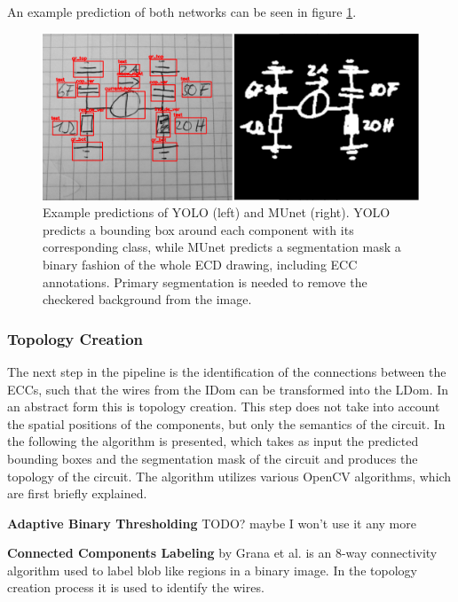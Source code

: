 An example prediction of both networks can be seen in figure \ref{fig:example_predictions}.

\begin{figure}
\begin{center}
    \includegraphics[width=16cm]{imgs/pipeline/combined_pred.png}
    \caption{Example predictions of YOLO (left) and \ac{MUnet} (right). YOLO predicts a bounding box around each component with its corresponding class, while \ac{MUnet} predicts a segmentation mask a binary fashion of the whole \ac{ECD} drawing, including \ac{ECC} annotations. Primary segmentation is needed to remove the checkered background from the image.}
    \label{fig:example_predictions}
\end{center}
\end{figure}

\subsubsection{Topology Creation}

The next step in the pipeline is the identification of the connections between the \acp{ECC}, such that the wires from the \ac{IDom} can be transformed into the \ac{LDom}.
In an abstract form this is topology creation.
This step does not take into account the spatial positions of the components, but only the semantics of the circuit.
In the following the algorithm is presented, which takes as input the predicted bounding boxes and the segmentation mask of the circuit and produces the topology of the circuit.
The algorithm utilizes various OpenCV algorithms, which are first briefly explained.

\textbf{Adaptive Binary Thresholding} TODO? maybe I won't use it any more

\textbf{Connected Components Labeling} by Grana et al. \cite{cca} is an 8-way connectivity algorithm used to label blob like regions in a binary image.
In the topology creation process it is used to identify the wires.

